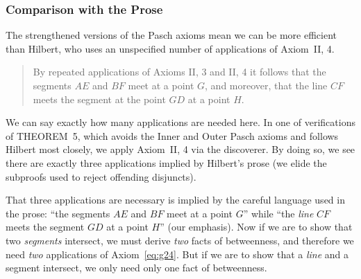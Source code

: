 \subsubsection{Comparison with the Prose}
The strengthened versions of the Pasch axioms mean we can be more efficient than Hilbert, who uses an unspecified number of applications of Axiom~II, 4.

\begin{quote}
By repeated applications of Axioms II, 3 and II, 4 it follows that the segments $AE$ and $BF$ meet at a point $G$, and moreover, that the line $CF$ meets the segment at the point $GD$ at a point $H$.
\end{quote}

We can say exactly how many applications are needed here. In one of verifications of THEOREM~5, which avoids the Inner and Outer Pasch axioms and follows Hilbert most closely, we apply Axiom~II, 4 via the  discoverer. By doing so, we see there are exactly three applications implied by Hilbert's prose (we elide the subproofs used to reject offending disjuncts).

\linebreak

That three applications are necessary is implied by the careful language used in the prose: ``the segments $AE$ and $BF$ meet at a point $G$'' while ``the \emph{line} $CF$ meets the segment $GD$ at a point $H$'' (our emphasis). Now if we are to show that two \emph{segments} intersect, we must derive \emph{two} facts of betweenness, and therefore we need \emph{two} applications of Axiom~\ref{eq:g24}. But if we are to show that a \emph{line} and a segment intersect, we only need only one fact of betweenness. 


